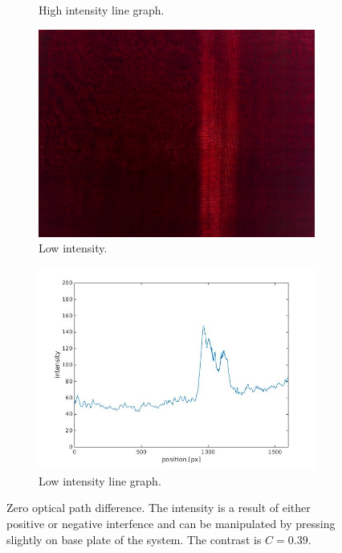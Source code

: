 \documentclass[a4paper, 12pt]{paper}
\begin{document}
\begin{figure}[H]
\begin{subfigure}[t]{0.45\textwidth}
        \caption{High intensity line graph.}
    \end{subfigure}
    \begin{subfigure}[t]{0.45\textwidth}
        \includegraphics[width=\textwidth]{img/ZOPD_low}
        \caption{Low intensity.}
    \end{subfigure}
    \begin{subfigure}[t]{0.45\textwidth}
        \includegraphics[width=\textwidth]{img/ZOPD_low_line}
        \caption{Low intensity line graph.}
    \end{subfigure}
    \caption{Zero optical path difference. The intensity is a result of either positive or negative interfence and can be manipulated by pressing slightly on base plate of the system. The contrast is $C = 0.39$.}
\label{fig:zopd}
\end{figure}
\end{document}
